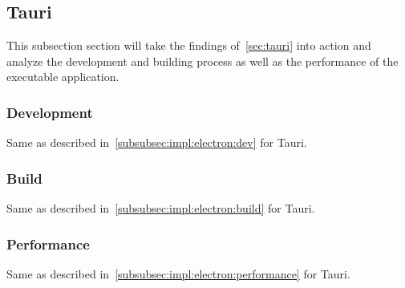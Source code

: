 \subsection{Tauri}\label{subsec:impl:tauri}
This subsection section will take the findings of~\ref{sec:tauri} into action and analyze
the development and building process as well as the performance of the executable application.

\subsubsection{Development}
Same as described in~\ref{subsubsec:impl:electron:dev} for Tauri.
\subsubsection{Build}
Same as described in~\ref{subsubsec:impl:electron:build} for Tauri.
\subsubsection{Performance}
Same as described in~\ref{subsubsec:impl:electron:performance} for Tauri.